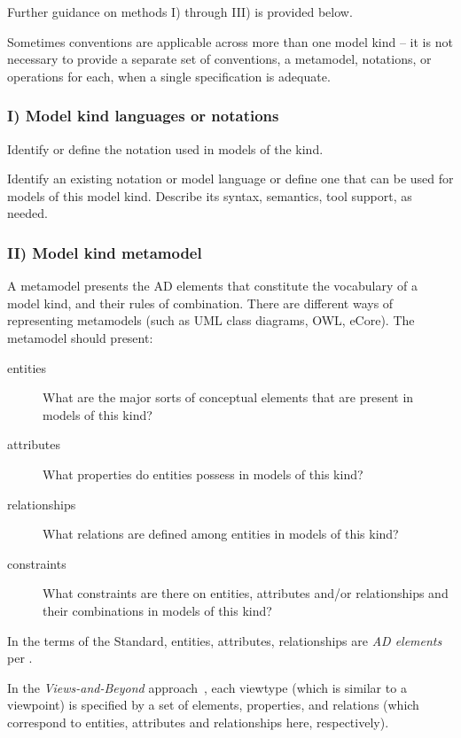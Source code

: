 Further guidance on methods I) through III) is provided below.
 
Sometimes conventions are applicable across more than one model kind
-- it is not necessary to provide a separate set of conventions, a
metamodel, notations, or operations for each, when a single
specification is adequate.


\subsubsection*{I) Model kind languages or notations \Optional}

Identify or define the notation used in models of the kind.

Identify an existing notation or model language or define one that can
be used for models of this model kind. Describe its syntax, semantics,
tool support, as needed.


\subsubsection*{II) Model kind metamodel \Optional} 

A metamodel presents the AD elements that constitute the
vocabulary of a model kind, and their rules of combination. There are
different ways of representing metamodels (such as UML class diagrams, OWL,
eCore). The metamodel should present:
\begin{description}
\item[entities] What are the major sorts of conceptual elements that
  are present in models of this kind?
\item[attributes] What properties do entities possess in models of
  this kind?
\item[relationships] What relations are defined among entities in
  models of this kind?
\item[constraints] What constraints are there on entities, attributes
  and/or relationships and their combinations in models of this kind?
\end{description}


In the terms of the Standard, entities, attributes, relationships are
\textit{AD elements} per .

In the \textit{Views-and-Beyond} approach~\cite{DSA:2010},  each
viewtype (which is similar to a viewpoint) is specified by a set of
elements, properties, and relations (which correspond to entities,
attributes and relationships here, respectively).

